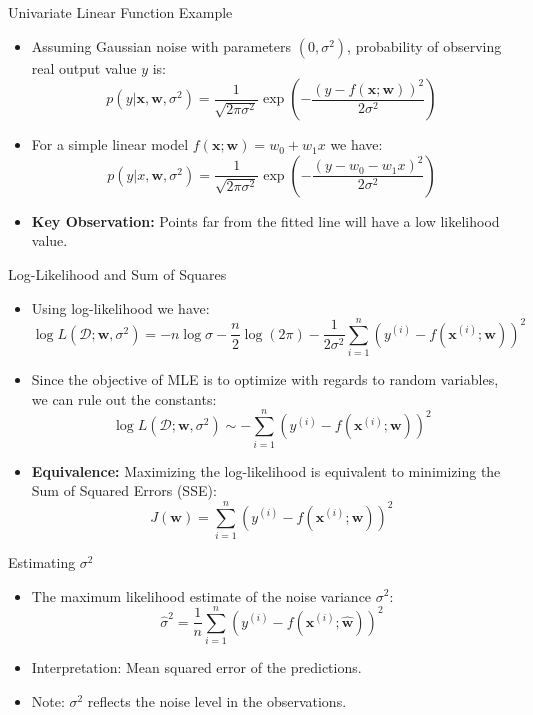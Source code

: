 \documentclass[serif, aspectratio=169]{beamer}
\begin{document}
\begin{frame}{Univariate Linear Function Example}
    \begin{itemize}
        \item Assuming Gaussian noise with parameters \( (0, \sigma^2) \), probability of observing real output value \( y \) is:
        \[
        p(y | \mathbf{x}, \mathbf{w}, \sigma^2) = \frac{1}{\sqrt{2\pi \sigma^2}} \exp \left( - \frac{(y - f(\mathbf{x}; \mathbf{w}))^2}{2\sigma^2} \right)
        \]

        \item For a simple linear model \( f(\mathbf{x}; \mathbf{w}) = w_0 + w_1 x \) we have:
        \[
        p(y | x, \mathbf{w}, \sigma^2) = \frac{1}{\sqrt{2\pi \sigma^2}} \exp \left( - \frac{(y - w_0 - w_1 x)^2}{2\sigma^2} \right)
        \]
        \item \textbf{Key Observation:} Points far from the fitted line will have a low likelihood value.
    \end{itemize}
\end{frame}

\begin{frame}{Log-Likelihood and Sum of Squares}
    \begin{itemize}
        \item Using log-likelihood we have:
        \[
        \log L(\mathcal{D}; \mathbf{w}, \sigma^2) = -n \log \sigma - \frac{n}{2} \log(2\pi) - \frac{1}{2\sigma^2} \sum_{i=1}^n (y^{(i)} - f(\mathbf{x}^{(i)}; \mathbf{w}))^2
        \]
        \item Since the objective of MLE is to optimize with regards to random variables, we can rule out the constants:
        \[
        \log L(\mathcal{D}; \mathbf{w}, \sigma^2) \sim - \sum_{i=1}^n (y^{(i)} - f(\mathbf{x}^{(i)}; \mathbf{w}))^2
        \]
        \item \textbf{Equivalence:} Maximizing the log-likelihood is equivalent to minimizing the Sum of Squared Errors (SSE):
        \[
        J(\mathbf{w}) = \sum_{i=1}^n (y^{(i)} - f(\mathbf{x}^{(i)}; \mathbf{w}))^2
        \]
    \end{itemize}
\end{frame}

\begin{frame}{Estimating \( \sigma^2 \)}
    \begin{itemize}
        \item The maximum likelihood estimate of the noise variance \( \sigma^2 \):
        \[
        \hat{\sigma}^2 = \frac{1}{n} \sum_{i=1}^n \left( y^{(i)} - f(\mathbf{x}^{(i)}; \hat{\mathbf{w}}) \right)^2
        \]
        \item Interpretation: Mean squared error of the predictions.
        \item Note: \( \sigma^2 \) reflects the noise level in the observations.
    \end{itemize}
\end{frame}
\end{document}
